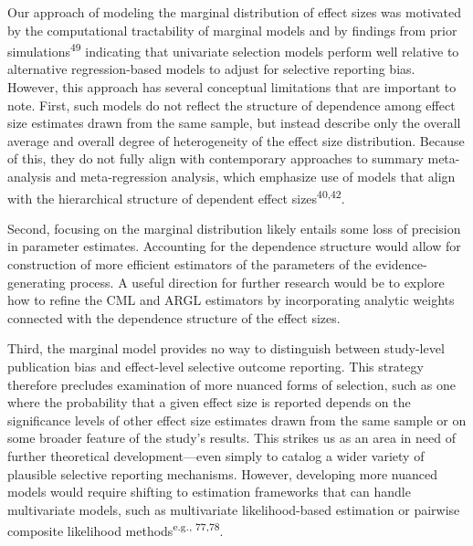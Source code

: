 \documentclass[
  american,
  man, donotrepeattitle,floatsintext]{apa7}
\begin{document}
Our approach of modeling the marginal distribution of effect sizes was motivated by the computational tractability of marginal models and by findings from prior simulations\textsuperscript{49} indicating that univariate selection models perform well relative to alternative regression-based models to adjust for selective reporting bias.
However, this approach has several conceptual limitations that are important to note.
First, such models do not reflect the structure of dependence among effect size estimates drawn from the same sample, but instead describe only the overall average and overall degree of heterogeneity of the effect size distribution.
Because of this, they do not fully align with contemporary approaches to summary meta-analysis and meta-regression analysis, which emphasize use of models that align with the hierarchical structure of dependent effect sizes\textsuperscript{40,42}.

Second, focusing on the marginal distribution likely entails some loss of precision in parameter estimates.
Accounting for the dependence structure would allow for construction of more efficient estimators of the parameters of the evidence-generating process.
A useful direction for further research would be to explore how to refine the CML and ARGL estimators by incorporating analytic weights connected with the dependence structure of the effect sizes.

Third, the marginal model provides no way to distinguish between study-level publication bias and effect-level selective outcome reporting.
This strategy therefore precludes examination of more nuanced forms of selection, such as one where the probability that a given effect size is reported depends on the significance levels of other effect size estimates drawn from the same sample or on some broader feature of the study's results.
This strikes us as an area in need of further theoretical development---even simply to catalog a wider variety of plausible selective reporting mechanisms.
However, developing more nuanced models would require shifting to estimation frameworks that can handle multivariate models, such as multivariate likelihood-based estimation or pairwise composite likelihood methods\textsuperscript{e.g., 77,78}.
\end{document}
